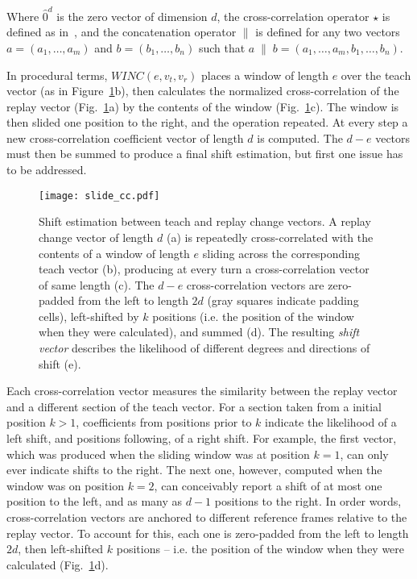 \documentclass[twocolumn, 9pt,fleqn]{jsproceedings}
\begin{document}
Where $\hat{0}^d$ is the zero vector of dimension $d$, the cross-correlation operator $\star$ is defined as in~\cite{HEL14b}, and the concatenation operator $\|$ is defined for any two vectors $a = (a_1, \dotsc, a_m)$ and $b = (b_1, \dotsc, b_n)$ such that $a \; \| \; b = (a_1, \dotsc, a_m, b_1, \dotsc, b_n)$.

In procedural terms, $WINC(e, v_t, v_r)$ places a window of length $e$ over the teach vector (as in Figure~\ref{fig:slide_cc}b), then calculates the normalized cross-correlation of the replay vector (Fig.~\ref{fig:slide_cc}a) by the contents of the window (Fig.~\ref{fig:slide_cc}c). The window is then slided one position to the right, and the operation repeated. At every step a new cross-correlation coefficient vector of length $d$ is computed. The $d - e$ vectors must then be summed to produce a final shift estimation, but first one issue has to be addressed.

\begin{figure}[h!]
\texttt{[image: slide\_cc.pdf]}
\caption{Shift estimation between teach and replay change vectors. A replay change vector of length $d$ (a) is repeatedly cross-correlated with the contents of a window of length $e$ sliding across the corresponding teach vector (b), producing at every turn a cross-correlation vector of same length (c). The $d - e$ cross-correlation vectors are zero-padded from the left to length $2d$ (gray squares indicate padding cells), left-shifted by $k$ positions (i.e. the position of the window when they were calculated), and summed (d). The resulting \textit{shift vector} describes the likelihood of different degrees and directions of shift (e).}
\label{fig:slide_cc}
\end{figure}

Each cross-correlation vector measures the similarity between the replay vector and a different section of the teach vector. For a section taken from a initial position $k > 1$, coefficients from positions prior to $k$ indicate the likelihood of a left shift, and positions following, of a right shift. For example, the first vector, which was produced when the sliding window was at position $k = 1$, can only ever indicate shifts to the right. The next one, however, computed when the window was on position $k = 2$, can conceivably report a shift of at most one position to the left, and as many as $d-1$ positions to the right. In order words, cross-correlation vectors are anchored to different reference frames relative to the replay vector. To account for this, each one is zero-padded from the left to length $2d$, then left-shifted $k$ positions -- i.e. the position of the window when they were calculated (Fig.~\ref{fig:slide_cc}d).
\end{document}
